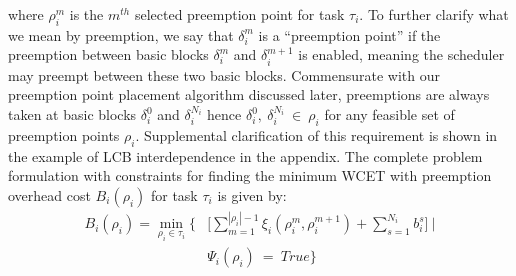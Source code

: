 where \begin{math}\rho_{i}^{m}\end{math} is the \textrm{$m^{th}$} selected preemption point for task \begin{math}\tau_{i}\end{math}.  To further clarify what we mean by preemption, we say that $\delta_i^m$ is a ``preemption point'' if the preemption between basic blocks $\delta_i^m$ and $\delta_i^{m+1}$ is enabled, meaning the scheduler may preempt between these two basic blocks.  Commensurate with our preemption point placement algorithm discussed later, preemptions are always taken at basic blocks $\delta_i^0$ and $\delta_i^{N_i}$ hence $\delta_i^0,\ \delta_i^{N_i}\ \in\ \rho_{i}$ for any feasible set of preemption points $\rho_i$.  Supplemental clarification of this requirement is shown in the example of LCB interdependence in the appendix.
%
\noindent
The complete problem formulation with constraints for finding the minimum WCET with preemption overhead cost \begin{math}B_{i}(\rho_{i})\end{math} for task \begin{math}\tau_{i}\end{math} is given by:
\begin{equation}\label{eqn:global-bbkwcet-cost}
\begin{split}
   B_{i}(\rho_{i}) = \min_{\rho_{i} \in \tau_{i}} \Big\{&\Big[\sum_{m=1}^{|\rho_{i}|-1} \xi_{i}(\rho_{i}^{m},\rho_{i}^{m+1}) + \sum_{s=1}^{N_i}b_{i}^{s}\Big]\ |\\
   &\Psi_{i}(\rho_{i})\ =\ True\Big\}
\end{split}
\end{equation}
